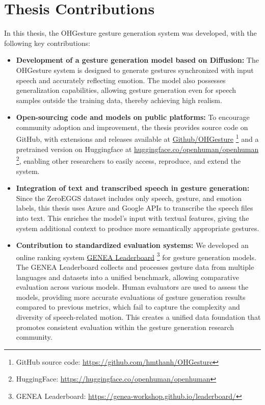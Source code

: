 \section{Thesis Contributions}
\label{sec:contribution}

In this thesis, the OHGesture gesture generation system was developed, with the following key contributions:

\begin{itemize}
	\item \textbf{Development of a gesture generation model based on Diffusion:} The OHGesture system is designed to generate gestures synchronized with input speech and accurately reflecting emotion. The model also possesses generalization capabilities, allowing gesture generation even for speech samples outside the training data, thereby achieving high realism.
	
	\item \textbf{Open-sourcing code and models on public platforms:} To encourage community adoption and improvement, the thesis provides source code on GitHub, with extensions and releases available at \hyperlink{https://github.com/hmthanh/OHGesture}{Github/OHGesture} \footnote{GitHub source code: \url{https://github.com/hmthanh/OHGesture}} and a pretrained version on Huggingface at \hyperlink{https://huggingface.co/openhuman/openhuman}{huggingface.co/openhuman/openhuman} \footnote{HuggingFace: \url{https://huggingface.co/openhuman/openhuman}}, enabling other researchers to easily access, reproduce, and extend the system.
	
	\item \textbf{Integration of text and transcribed speech in gesture generation:} Since the ZeroEGGS dataset includes only speech, gesture, and emotion labels, this thesis uses Azure and Google APIs to transcribe the speech files into text. This enriches the model’s input with textual features, giving the system additional context to produce more semantically appropriate gestures.
	
	\item \textbf{Contribution to standardized evaluation systems:} We developed an online ranking system \hyperlink{https://genea-workshop.github.io/leaderboard/}{GENEA Leaderboard} \footnote{GENEA Leaderboard: \url{https://genea-workshop.github.io/leaderboard/}} \cite{nagy2024towards} for gesture generation models. The GENEA Leaderboard collects and processes gesture data from multiple languages and datasets into a unified benchmark, allowing comparative evaluation across various models. Human evaluators are used to assess the models, providing more accurate evaluations of gesture generation results compared to previous metrics, which fail to capture the complexity and diversity of speech-related motion. This creates a unified data foundation that promotes consistent evaluation within the gesture generation research community.
	

\end{itemize}
